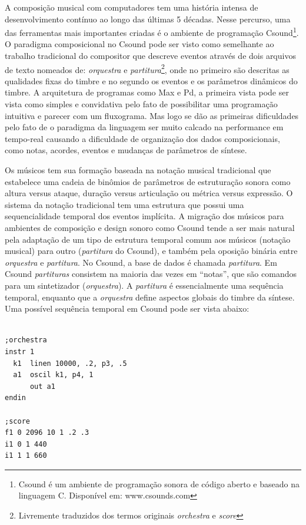 \documentclass{ppgmus}
\begin{document}
A composição musical com computadores tem uma história intensa de desenvolvimento
contínuo ao longo das últimas 5 décadas. Nesse percurso, uma das ferramentas mais
importantes criadas é o ambiente de programação Csound\footnote{Csound é um ambiente de programação
sonora de código aberto e baseado na linguagem C. Disponível em: www.csounds.com}.
O paradigma composicional no Csound pode ser visto como semelhante ao
trabalho tradicional do compositor que descreve eventos através de
dois arquivos de texto nomeados de: \textit{orquestra} e \textit{partitura}\footnote{Livremente traduzidos
dos termos originais \textit{orchestra} e \textit{score}}, onde no primeiro são
descritas as qualidades fixas do timbre e no segundo os eventos e os
parâmetros dinâmicos do timbre. A arquitetura de programas como Max e
Pd, a primeira vista pode ser vista como simples e convidativa pelo
fato de possibilitar uma programação intuitiva e parecer com um
fluxograma. Mas logo se dão as primeiras dificuldades pelo fato de o
paradigma da linguagem ser muito calcado na performance em tempo-real
causando a dificuldade de organização dos dados composicionais, como
notas, acordes, eventos e mudanças de parâmetros de síntese.

Os músicos tem sua formação baseada na notação musical tradicional que
estabelece uma cadeia de binômios de parâmetros de estruturação sonora
\cite{zampronha00:notacao} como altura versus ataque, duração versus
articulação ou métrica versus expressão. O sistema da notação
tradicional tem uma estrutura que possui uma sequencialidade temporal
dos eventos implícita. A migração dos músicos para ambientes de
composição e design sonoro como Csound \cite{boulanger00:csound} tende
a ser mais natural pela adaptação de um tipo de estrutura temporal comum aos músicos
(notação musical) para outro (\textit{partitura} do Csound), e também pela oposição binária entre
\textit{orquestra} e \textit{partitura}. 
No Csound, a base de dados é chamada
\textit{partitura}. Em Csound \textit{partituras} consistem na maioria das vezes em
``notas'', que são comandos para um sintetizador (\textit{orquestra}). A \textit{partitura}
é essencialmente uma sequência temporal, enquanto que a \textit{orquestra}
define aspectos globais do timbre da síntese. Uma possível sequência
temporal em Csound pode ser vista abaixo:

\singlespacing
\footnotesize
\begin{verbatim}

;orchestra
instr 1
  k1  linen 10000, .2, p3, .5
  a1  oscil k1, p4, 1
      out a1
endin

;score
f1 0 2096 10 1 .2 .3
i1 0 1 440
i1 1 1 660
\end{verbatim}
\normalsize
\doublespacing 
\end{document}
